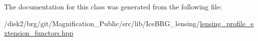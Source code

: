 The documentation for this class was generated from the following file\+:\begin{DoxyCompactItemize}
\item 
/disk2/brg/git/\+Magnification\+\_\+\+Public/src/lib/\+Ice\+B\+R\+G\+\_\+lensing/\hyperlink{lensing__profile__extension__functors_8hpp}{lensing\+\_\+profile\+\_\+extension\+\_\+functors.\+hpp}\end{DoxyCompactItemize}
